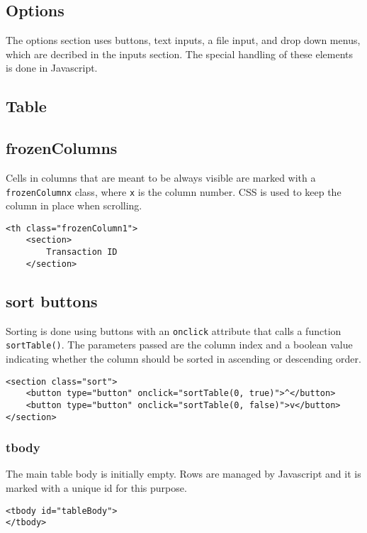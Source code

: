 \documentclass[letterpaper]{article}
\begin{document}
\subsection{Options}

The options section uses buttons, text inputs, a file input, and drop down menus, which are decribed in the inputs section.
The special handling of these elements is done in Javascript.

\subsection{Table}

\subsection{frozenColumns}

Cells in columns that are meant to be always visible are marked with a \lstinline{frozenColumnx} class, where \lstinline{x} is the column number.
CSS is used to keep the column in place when scrolling.
\begin{lstlisting}[firstnumber=233]
<th class="frozenColumn1">
    <section>
        Transaction ID
    </section>
\end{lstlisting}

\subsection{sort buttons}

Sorting is done using buttons with an \lstinline{onclick} attribute that calls a function \lstinline{sortTable()}.
The parameters passed are the column index and a boolean value indicating whether the column should be sorted in ascending or descending order.
\begin{lstlisting}[firstnumber=237]
<section class="sort">
    <button type="button" onclick="sortTable(0, true)">^</button>
    <button type="button" onclick="sortTable(0, false)">v</button>
</section>
\end{lstlisting}

\subsubsection{tbody}

The main table body is initially empty.
Rows are managed by Javascript and it is marked with a unique id for this purpose.
\begin{lstlisting}[firstnumber=317]
<tbody id="tableBody">
</tbody>
\end{lstlisting}
\end{document}
